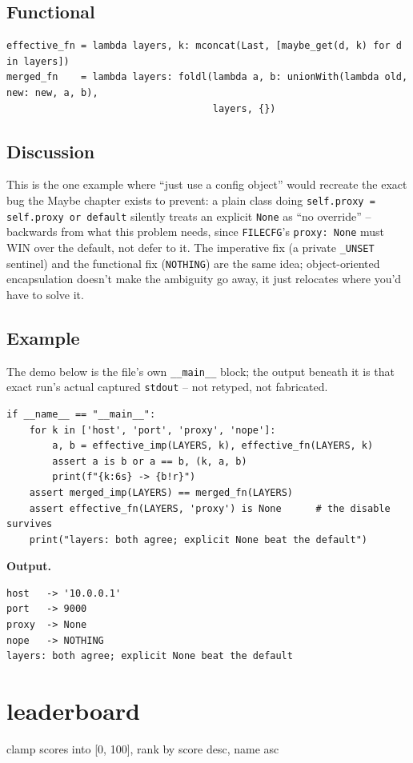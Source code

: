 \documentclass[10pt,letterpaper]{book}
\begin{document}
\section*{Functional}
\begin{lstlisting}[style=code]
effective_fn = lambda layers, k: mconcat(Last, [maybe_get(d, k) for d in layers])
merged_fn    = lambda layers: foldl(lambda a, b: unionWith(lambda old, new: new, a, b),
                                    layers, {})
\end{lstlisting}
\section*{Discussion}

This is the one example where ``just use a config object'' would
recreate the exact bug the Maybe chapter exists to prevent: a plain class
doing \texttt{self.proxy = self.proxy or default} silently treats an
explicit \texttt{None} as ``no override'' -- backwards from what this
problem needs, since \texttt{FILECFG}'s \texttt{proxy: None} must WIN
over the default, not defer to it. The imperative fix (a private
\texttt{\_UNSET} sentinel) and the functional fix (\texttt{NOTHING}) are
the same idea; object-oriented encapsulation doesn't make the ambiguity
go away, it just relocates where you'd have to solve it.

\section*{Example}
The demo below is the file's own \texttt{\_\_main\_\_} block; the output beneath it is that exact run's actual captured \texttt{stdout} -- not retyped, not fabricated.
\begin{lstlisting}[style=code]
if __name__ == "__main__":
    for k in ['host', 'port', 'proxy', 'nope']:
        a, b = effective_imp(LAYERS, k), effective_fn(LAYERS, k)
        assert a is b or a == b, (k, a, b)
        print(f"{k:6s} -> {b!r}")
    assert merged_imp(LAYERS) == merged_fn(LAYERS)
    assert effective_fn(LAYERS, 'proxy') is None      # the disable survives
    print("layers: both agree; explicit None beat the default")
\end{lstlisting}
\noindent\textbf{Output.}
\begin{lstlisting}[style=ex]
host   -> '10.0.0.1'
port   -> 9000
proxy  -> None
nope   -> NOTHING
layers: both agree; explicit None beat the default
\end{lstlisting}
\chapter{leaderboard}
clamp scores into [0, 100], rank by score desc, name asc
\end{document}
